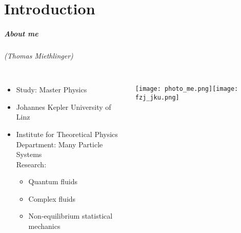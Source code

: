 








\part{Introduction}
\makepart

\begin{frame}
\frametitle{About me}
\framesubtitle{(Thomas Miethlinger)}
\begin{columns}[T]
 \begin{column}{.35\textwidth}
 \begin{itemize}
  \item Study: Master Physics
  \item Johannes Kepler University of Linz
  \item Institute for Theoretical Physics \\ Department: Many Particle Systems \\
        Research:
        \begin{itemize}
         \item Quantum fluids
         \item Complex fluids
         \item Non-equilibrium statistical mechanics
        \end{itemize}
\end{itemize}
 \end{column}
 \hfill
 \begin{column}{.65\textwidth}
 \texttt{[image: photo\_me.png]}\texttt{[image: fzj\_jku.png]}
 \end{column}
\end{columns}
\end{frame}

